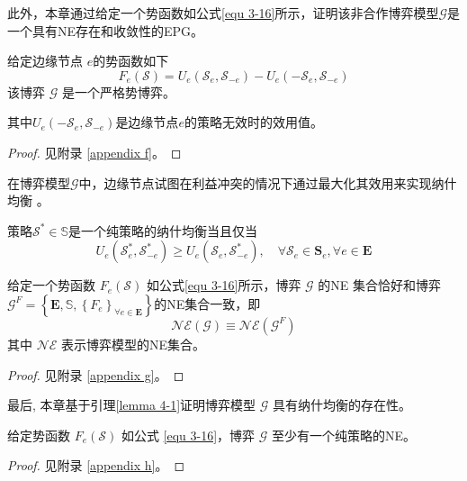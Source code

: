 此外，本章通过给定一个势函数如公式\ref{equ 3-16}所示，证明该非合作博弈模型$\mathcal{G}$是一个具有NE存在和收敛性的EPG。
\begin{theorem}
给定边缘节点 $e$的势函数如下
\begin{equation}
	{F}_{e}\left(\mathcal{S}\right) = {U}_{e}\left(\mathcal{S}_{e}, \mathcal{S}_{-e}\right) - {U}_{e}\left(-\mathcal{S}_{e}, \mathcal{S}_{-e}\right)
	\label{equ 3-16}
\end{equation}
该博弈 $\mathcal{G}$ 是一个严格势博弈。
\label{theorem 4-1}
\end{theorem}
\noindent 其中${U}_{e}\left(-\mathcal{S}_{e}, \mathcal{S}_{-e}\right)$是边缘节点$e$的策略无效时的效用值。
\begin{proof} 见附录 \ref{appendix f}。
\end{proof}
\noindent 在博弈模型$\mathcal{G}$中，边缘节点试图在利益冲突的情况下通过最大化其效用来实现纳什均衡 \cite{chew2016potential}。
\begin{definition}
策略$\mathcal{S}^{*} \in \mathbb{S}$是一个纯策略的纳什均衡\cite{chew2016potential}当且仅当
	\begin{equation}
		U_{e}\left(\mathcal{S}_{e}^{*}, \mathcal{S}_{-e}^{*}\right) \geq U_{e}\left(\mathcal{S}_{e}, \mathcal{S}_{-e}^{*}\right), \quad \forall \mathcal{S}_{e} \in \mathbf{S}_{e}, \forall e \in \mathbf{E}
	\end{equation}
\end{definition}
\begin{lemma}
	给定一个势函数 $F_{e}(\mathcal{S})$ 如公式\ref{equ 3-16}所示，博弈 $\mathcal{G}$ 的NE 集合恰好和博弈$\mathcal{G}^{F}=\left\{\mathbf{E}, \mathbb{S}, \left\{{F}_{e}\right\}_{\forall e \in \mathbf{E}} \right\}$的NE集合一致，即
	\begin{equation}
		\mathcal{NE}(\mathcal{G}) \equiv \mathcal{NE}\left(\mathcal{G}^{F}\right)
	\end{equation}
	其中 $\mathcal{NE}$ 表示博弈模型的NE集合。
\label{lemma 4-1}
\end{lemma}
\begin{proof} 见附录 \ref{appendix g}。
\end{proof}
\noindent 最后, 本章基于引理\ref{lemma 4-1}证明博弈模型 $\mathcal{G}$ 具有纳什均衡的存在性。
\begin{theorem}
	给定势函数 $F_{e}(\mathcal{S})$ 如公式 \ref{equ 3-16}，博弈 $\mathcal{G}$ 至少有一个纯策略的NE。
\label{theorem 4-2}
\end{theorem}
\begin{proof} 见附录 \ref{appendix h}。
\end{proof}
